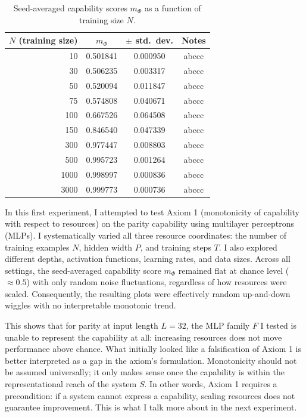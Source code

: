 \documentclass[12pt]{article}
\begin{document}
\begin{table}[h]
\centering
\begin{tabular}{rccc}
\toprule
$N$ (training size) & $m_\Phi$ & $\pm$ std.~dev. & Notes \\
\midrule
10  & 0.501841 & 0.000950 & abccc \\
30  & 0.506235 &  0.003317 & abccc \\
50 & 0.520094 & 0.011847 & abccc \\
75 & 0.574808 & 0.040671 & abccc \\
100 & 0.667526 & 0.064508 & abccc \\
150 & 0.846540 & 0.047339 & abccc \\
300 & 0.977447 & 0.008803 & abccc \\
500 & 0.995723 & 0.001264 & abccc \\
1000 & 0.998997 & 0.000836 & abccc \\
3000 & 0.999773 & 0.000736 & abccc \\

\bottomrule
\end{tabular}
\caption{Seed-averaged capability scores $m_\Phi$ as a function of training size $N$.}
\label{tab:mphi-results}
\end{table}
\clearpage

In this first experiment, I attempted to test Axiom 1 (monotonicity of capability with respect to resources) on the parity capability using multilayer perceptrons (MLPs). I systematically varied all three resource coordinates: the number of training examples $N$, hidden width $P$, and training steps $T$. I also explored different depths, activation functions, learning rates, and data sizes. Across all settings, the seed-averaged capability score $m_\Phi$ remained flat at chance level ($ \approx 0.5$) with only random noise fluctuations, regardless of how resources were scaled. Consequently, the resulting plots were effectively random up-and-down wiggles with no interpretable monotonic trend.

This shows that for parity at input length $L=32$, the MLP family $F$ I tested is unable to represent the capability at all: increasing resources does not move performance above chance. What initially looked like a falsification of Axiom 1 is better interpreted as a gap in the axiom’s formulation. Monotonicity should not be assumed universally; it only makes sense once the capability is within the representational reach of the system $S$. In other words, Axiom 1 requires a precondition: if a system cannot express a capability, scaling resources does not guarantee improvement. This is what I talk more about in the next experiment.
\end{document}
